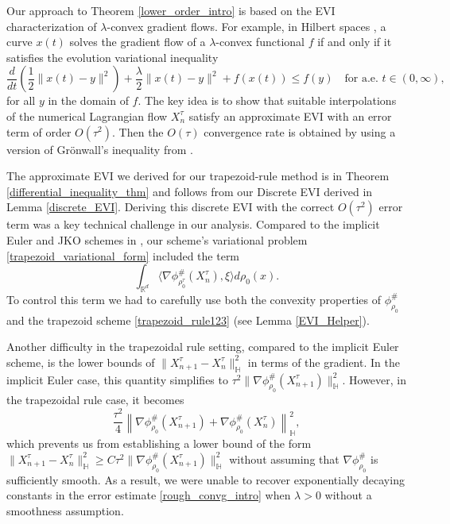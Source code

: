 \documentclass[11pt,a4paper]{amsart}
\newcommand{\1}{\mathds{1}}
\newcommand{\R}{{\mathbb R}}
\numberwithin{equation}{section}
\begin{document}
Our approach to Theorem \ref{lower_order_intro} is based on the EVI characterization of $\lambda$-convex gradient flows. For example, in Hilbert spaces \cite{ambrosio2021lectures}, a curve $x(t)$ solves the gradient flow of a $\lambda$-convex functional $f$ if and only if it satisfies the evolution variational inequality
\[
\frac{d}{dt} \left( \frac{1}{2} \|x(t) - y\|^2 \right) + \frac{\lambda}{2} \|x(t) - y\|^2 + f(x(t)) \leq f(y) \quad \text{for a.e. } t \in (0,\infty),
\]
for all $y$ in the domain of $f$. The key idea is to show that suitable interpolations of the numerical Lagrangian flow $X^{\tau}_n$ satisfy an approximate EVI with an error term of order $O(\tau^2)$. Then the $O(\tau)$ convergence rate is obtained by using a version of Grönwall's inequality from \cite{ambrosio2005gradient}.

\smallskip

The approximate EVI we derived for our trapezoid-rule method is in Theorem \ref{differential_inequality_thm} and follows from our Discrete EVI derived in Lemma \ref{discrete_EVI}. Deriving this discrete EVI with the correct $O(\tau^2)$ error term was a key technical challenge in our analysis. Compared to the implicit Euler and JKO schemes in \cite{ambrosio2005gradient}, our scheme's variational problem \eqref{trapezoid_variational_form} included the term
\[ \int_{\R^d} \langle \nabla \phi^{\#}_{\rho^{\tau}_0}(X^{\tau}_n),\xi \rangle d\rho_0(x). \] To control this term we had to carefully use both the convexity properties of $\phi^{\#}_{\rho_0}$ and the trapezoid scheme \eqref{trapezoid_rule123} (see Lemma \ref{EVI_Helper}). \smallskip

Another difficulty in the trapezoidal rule setting, compared to the implicit Euler scheme, is the lower bounds of $\|X^{\tau}_{n+1} - X^{\tau}_n\|^2_{\mathbb{H}}$ in terms of the gradient. In the implicit Euler case, this quantity simplifies to $\tau^2 \|\nabla \phi^{\#}_{\rho_0}(X^{\tau}_{n+1})\|^2_{\mathbb{H}}$. However, in the trapezoidal rule case, it becomes
\[
\frac{\tau^2}{4} \left\| \nabla \phi^{\#}_{\rho_0}(X^{\tau}_{n+1}) + \nabla \phi^{\#}_{\rho_0}(X^{\tau}_n) \right\|^2_{\mathbb{H}},
\]
which prevents us from establishing a lower bound of the form $\|X^{\tau}_{n+1} - X^{\tau}_n\|^2_{\mathbb{H}} \geq C \tau^2 \|\nabla \phi^{\#}_{\rho_0}(X^{\tau}_{n+1})\|^2_{\mathbb{H}}$ without assuming that $\nabla \phi^{\#}_{\rho_0}$ is sufficiently smooth. As a result, we were unable to recover exponentially decaying constants in the error estimate \eqref{rough_convg_intro} when $\lambda > 0$ without a smoothness assumption.
\end{document}
